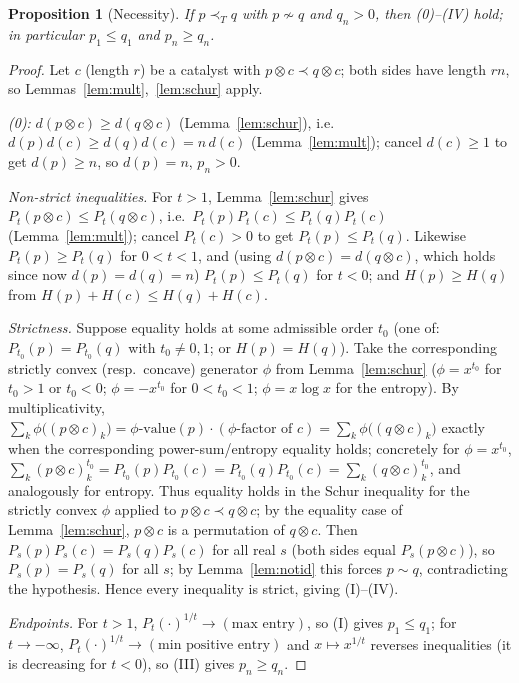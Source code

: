 \documentclass{amsart}
\theoremstyle{plain}
\newtheorem{proposition}{Proposition}
\theoremstyle{definition}
\newcommand{\maj}{\prec}
\newcommand{\trump}{\prec_T}
\begin{document}
\begin{proposition}[Necessity]\label{prop:nec}
If $p\trump q$ with $p\not\sim q$ and $q_n>0$, then \textnormal{(0)--(IV)} hold; in
particular $p_1\le q_1$ and $p_n\ge q_n$.
\end{proposition}
\begin{proof}
Let $c$ (length $r$) be a catalyst with $p\otimes c\maj q\otimes c$; both sides have
length $rn$, so Lemmas~\ref{lem:mult},~\ref{lem:schur} apply.

\emph{(0):} $d(p\otimes c)\ge d(q\otimes c)$ (Lemma~\ref{lem:schur}), i.e.\
$d(p)d(c)\ge d(q)d(c)=n\,d(c)$ (Lemma~\ref{lem:mult}); cancel $d(c)\ge1$ to get
$d(p)\ge n$, so $d(p)=n$, $p_n>0$.

\emph{Non-strict inequalities.} For $t>1$, Lemma~\ref{lem:schur} gives
$P_t(p\otimes c)\le P_t(q\otimes c)$, i.e.\ $P_t(p)P_t(c)\le P_t(q)P_t(c)$
(Lemma~\ref{lem:mult}); cancel $P_t(c)>0$ to get $P_t(p)\le P_t(q)$. Likewise
$P_t(p)\ge P_t(q)$ for $0<t<1$, and (using $d(p\otimes c)=d(q\otimes c)$, which holds
since now $d(p)=d(q)=n$) $P_t(p)\le P_t(q)$ for $t<0$; and $H(p)\ge H(q)$ from
$H(p)+H(c)\le H(q)+H(c)$.

\emph{Strictness.} Suppose equality holds at some admissible order $t_0$ (one of:
$P_{t_0}(p)=P_{t_0}(q)$ with $t_0\ne0,1$; or $H(p)=H(q)$). Take the corresponding
strictly convex (resp.\ concave) generator $\phi$ from Lemma~\ref{lem:schur}
($\phi=x^{t_0}$ for $t_0>1$ or $t_0<0$; $\phi=-x^{t_0}$ for $0<t_0<1$;
$\phi=x\log x$ for the entropy). By multiplicativity,
$\sum_k\phi\big((p\otimes c)_k\big)=\phi\text{-value}(p)\cdot(\text{$\phi$-factor of }c)
=\sum_k\phi\big((q\otimes c)_k\big)$ exactly when the corresponding power-sum/entropy
equality holds; concretely for $\phi=x^{t_0}$,
$\sum_k(p\otimes c)_k^{t_0}=P_{t_0}(p)P_{t_0}(c)=P_{t_0}(q)P_{t_0}(c)
=\sum_k(q\otimes c)_k^{t_0}$, and analogously for entropy. Thus equality holds in the
Schur inequality for the strictly convex $\phi$ applied to $p\otimes c\maj q\otimes c$;
by the equality case of Lemma~\ref{lem:schur}, $p\otimes c$ is a permutation of
$q\otimes c$. Then $P_s(p)P_s(c)=P_s(q)P_s(c)$ for all real $s$ (both sides equal
$P_s(p\otimes c)$), so $P_s(p)=P_s(q)$ for all $s$; by Lemma~\ref{lem:notid} this
forces $p\sim q$, contradicting the hypothesis. Hence every inequality is strict,
giving (I)--(IV).

\emph{Endpoints.} For $t>1$, $P_t(\cdot)^{1/t}\to(\text{max entry})$, so (I) gives
$p_1\le q_1$; for $t\to-\infty$, $P_t(\cdot)^{1/t}\to(\text{min positive entry})$ and
$x\mapsto x^{1/t}$ reverses inequalities (it is decreasing for $t<0$), so (III) gives $p_n\ge q_n$.
\end{proof}
\end{document}
